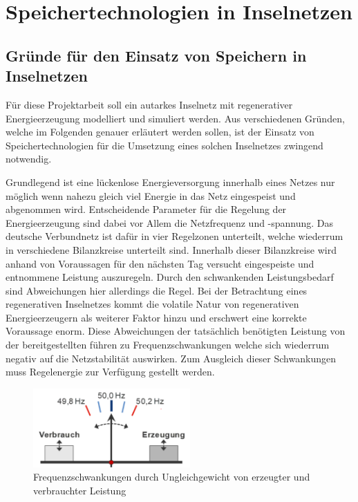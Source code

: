 \section{Speichertechnologien in Inselnetzen}

\subsection{Gründe für den Einsatz von Speichern in Inselnetzen}
Für diese Projektarbeit soll ein autarkes Inselnetz mit regenerativer Energieerzeugung 
modelliert und simuliert werden.
Aus verschiedenen Gründen, welche im Folgenden genauer erläutert werden sollen, ist der Einsatz von
Speichertechnologien für die Umsetzung eines solchen Inselnetzes zwingend notwendig.

Grundlegend ist eine lückenlose Energieversorgung innerhalb eines Netzes nur möglich wenn nahezu gleich viel Energie in das Netz
eingespeist und abgenommen wird.
Entscheidende Parameter für die Regelung der Energieerzeugung sind dabei vor Allem die Netzfrequenz 
und -spannung.
Das deutsche Verbundnetz ist dafür in vier Regelzonen unterteilt, welche wiederrum in verschiedene
Bilanzkreise unterteilt sind.
Innerhalb dieser Bilanzkreise wird anhand von Voraussagen für den nächsten Tag versucht
eingespeiste und entnommene Leistung auszuregeln.
Durch den schwankenden Leistungsbedarf sind Abweichungen hier allerdings die Regel.
Bei der Betrachtung eines regenerativen Inselnetzes kommt die volatile Natur von regenerativen Energieerzeugern
als weiterer Faktor hinzu und erschwert eine korrekte Voraussage enorm.
Diese Abweichungen der tatsächlich benötigten Leistung von der bereitgestellten führen zu Frequenzschwankungen
welche sich wiederrum negativ auf die Netzstabilität auswirken.
Zum Ausgleich dieser Schwankungen muss Regelenergie zur Verfügung gestellt werden.

\begin{figure}[h!]
    \centering
    \includegraphics[width=6cm]{Abbildungen/Sollfrequenz.png}
    \caption{Frequenzschwankungen durch Ungleichgewicht von erzeugter und verbrauchter Leistung~\parencite{cronenberg_beschreibung_nodate}}\label{Gleichgewicht}
\end{figure}

